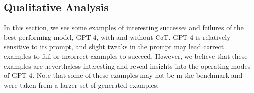 \subsection{Qualitative Analysis} \label{sec:appendix-qualitative}
In this section, we see some examples of interesting successes and failures of the best performing model, GPT-4, with and without CoT. GPT-4 is relatively sensitive to its prompt, and slight tweaks in the prompt may lead correct examples to fail or incorrect examples to succeed. However, we believe that these examples are nevertheless interesting and reveal insights into the operating modes of GPT-4. Note that some of these examples may not be in the benchmark and were taken from a larger set of generated examples.



